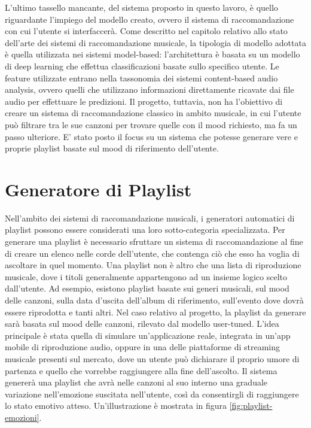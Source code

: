 \documentclass[11pt]{report}
\begin{document}
L'ultimo tassello mancante, del sistema proposto in questo lavoro, è quello riguardante l'impiego del modello creato, ovvero il sistema di raccomandazione con cui l'utente si interfaccerà. Come descritto nel capitolo relativo allo stato dell'arte dei sistemi di raccomandazione musicale, la tipologia di modello adottata è quella utilizzata nei sistemi model-based: l'architettura è basata su un modello di deep learning che effettua classificazioni basate sullo specifico utente. Le feature utilizzate entrano nella tassonomia dei sistemi content-based audio analysis, ovvero quelli che utilizzano informazioni direttamente ricavate dai file audio per effettuare le predizioni. Il progetto, tuttavia, non ha l'obiettivo di creare un sistema di raccomandazione classico in ambito musicale, in cui l'utente può filtrare tra le sue canzoni per trovare quelle con il mood richiesto, ma fa un passo ulteriore. E' stato posto il focus su un sistema che potesse generare vere e proprie playlist basate sul mood di riferimento dell'utente. 


\section{Generatore di Playlist}


Nell'ambito dei sistemi di raccomandazione musicali, i generatori automatici di playlist possono essere considerati una loro sotto-categoria specializzata. Per generare una playlist è necessario sfruttare un sistema di raccomandazione al fine di creare un elenco nelle corde dell'utente, che contenga ciò che esso ha voglia di ascoltare in quel momento. Una playlist non è altro che una lista di riproduzione musicale, dove i titoli generalmente appartengono ad un insieme logico scelto dall'utente. Ad esempio, esistono playlist basate sui generi musicali, sul mood delle canzoni, sulla data d'uscita dell'album di riferimento, sull'evento dove dovrà essere riprodotta e tanti altri. Nel caso relativo al progetto, la playlist da generare sarà basata sul mood delle canzoni, rilevato dal modello user-tuned. L'idea principale è stata quella di simulare un'applicazione reale, integrata in un'app mobile di riproduzione audio, oppure in una delle piattaforme di streaming musicale presenti sul mercato, dove un utente può dichiarare il proprio umore di partenza e quello che vorrebbe raggiungere alla fine dell'ascolto. Il sistema genererà una playlist che avrà nelle canzoni al suo interno una graduale variazione nell'emozione suscitata nell'utente, così da consentirgli di raggiungere lo stato emotivo atteso. Un'illustrazione è mostrata in figura \ref{fig:playlist-emozioni}.
\end{document}
